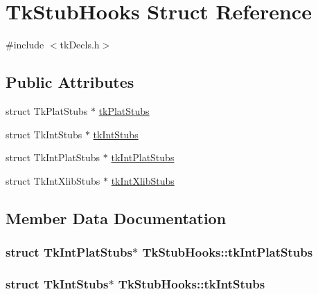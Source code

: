\hypertarget{struct_tk_stub_hooks}{}\section{Tk\+Stub\+Hooks Struct Reference}
\label{struct_tk_stub_hooks}


{\ttfamily \#include $<$tk\+Decls.\+h$>$}

\subsection*{Public Attributes}
\begin{DoxyCompactItemize}
\item 
struct Tk\+Plat\+Stubs $\ast$ \hyperlink{struct_tk_stub_hooks_aa07ff4b87048eef11197f59d9e08af65}{tk\+Plat\+Stubs}
\item 
struct Tk\+Int\+Stubs $\ast$ \hyperlink{struct_tk_stub_hooks_a92567acfa99f713588c9c46d69c34be6}{tk\+Int\+Stubs}
\item 
struct Tk\+Int\+Plat\+Stubs $\ast$ \hyperlink{struct_tk_stub_hooks_ae36506a0cf923615438d142fffe65dc5}{tk\+Int\+Plat\+Stubs}
\item 
struct Tk\+Int\+Xlib\+Stubs $\ast$ \hyperlink{struct_tk_stub_hooks_a9be5cddb8d929624a951b7573b9952b0}{tk\+Int\+Xlib\+Stubs}
\end{DoxyCompactItemize}


\subsection{Member Data Documentation}
\subsubsection[{\texorpdfstring{tk\+Int\+Plat\+Stubs}{tkIntPlatStubs}}]{\setlength{\rightskip}{0pt plus 5cm}struct Tk\+Int\+Plat\+Stubs$\ast$ Tk\+Stub\+Hooks\+::tk\+Int\+Plat\+Stubs}\hypertarget{struct_tk_stub_hooks_ae36506a0cf923615438d142fffe65dc5}{}\label{struct_tk_stub_hooks_ae36506a0cf923615438d142fffe65dc5}
\subsubsection[{\texorpdfstring{tk\+Int\+Stubs}{tkIntStubs}}]{\setlength{\rightskip}{0pt plus 5cm}struct Tk\+Int\+Stubs$\ast$ Tk\+Stub\+Hooks\+::tk\+Int\+Stubs}\hypertarget{struct_tk_stub_hooks_a92567acfa99f713588c9c46d69c34be6}{}\label{struct_tk_stub_hooks_a92567acfa99f713588c9c46d69c34be6}
